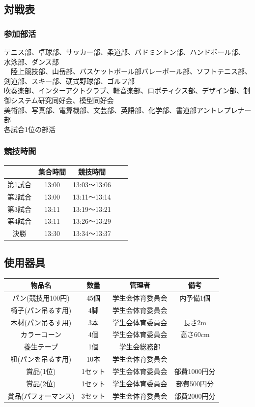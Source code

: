 \documentclass[titlepage]{jarticle}
\begin{document}
  \subsection{対戦表}
   \subsubsection{参加部活}
     テニス部、卓球部、サッカー部、柔道部、バドミントン部、ハンドボール部、水泳部、ダンス部\\

    　陸上競技部、山岳部、バスケットボール部バレーボール部、ソフトテニス部、剣道部、スキー部、硬式野球部、ゴルフ部\\

     吹奏楽部、インターアクトクラブ、軽音楽部、ロボティクス部、デザイン部、制御システム研究同好会、模型同好会\\

     美術部、写真部、電算機部、文芸部、英語部、化学部、書道部アントレプレナー部\\

     各試合1位の部活
   \subsubsection{競技時間}
    \begin{table}[H]
     \begin{tabular}{c|cccc}
       &集合時間&競技時間\\ \hline\hline
      第1試合&13:00&13:03～13:06\\
      第2試合&13:00&13:11～13:14\\
      第3試合&13:11&13:19～13:21\\
      第4試合&13:11&13:26～13:29\\
      決勝   &13:30&13:34～13:37\\
     \end{tabular}
    \end{table}
  \subsection{使用器具}
   \begin{table}[H]
    \begin{tabular}{cccc}
     物品名&数量&管理者&備考\\ \hline\hline
     パン(競技用100円)&45個&学生会体育委員会&内予備1個\\
椅子(パン吊るす用)&4脚&学生会体育委員会&\\
木材(パン吊るす用)&3本&学生会体育委員会&長さ2m\\
カラーコーン&4個&学生会体育委員会&高さ60cm\\
養生テープ&1個&学生会総務部&\\
紐(パンを吊るす用)&10本&学生会体育委員会&\\
賞品(1位)&1セット&学生会体育委員会&部費1000円分\\
賞品(2位)&1セット&学生会体育委員会&部費500円分\\
賞品(パフォーマンス)&3セット&学生会体育委員会&部費2000円分\\
    \end{tabular}
   \end{table}
\end{document}
